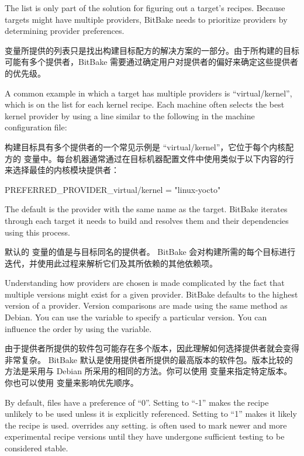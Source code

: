 
The  list is only part of the solution for figuring out a target's recipes. Because targets might have multiple providers, BitBake needs to prioritize providers by determining provider preferences.

 变量所提供的列表只是找出构建目标配方的解决方案的一部分。由于所构建的目标可能有多个提供者，BitBake 需要通过确定用户对提供者的偏好来确定这些提供者的优先级。

A common example in which a target has multiple providers is ``virtual/kernel'', which is on the  list for each kernel recipe. Each machine often selects the best kernel provider by using a line similar to the following in the machine configuration file:

构建目标具有多个提供者的一个常见示例是 ``virtual/kernel''，它位于每个内核配方的  变量中。每台机器通常通过在目标机器配置文件中使用类似于以下内容的行来选择最佳的内核模块提供者：

\begin{pyglist}
PREFERRED_PROVIDER_virtual/kernel = "linux-yocto"
\end{pyglist}

The default  is the provider with the same name as the target. BitBake iterates through each target it needs to build and resolves them and their dependencies using this process.

默认的  变量的值是与目标同名的提供者。 BitBake 会对构建所需的每个目标进行迭代，并使用此过程来解析它们及其所依赖的其他依赖项。

Understanding how providers are chosen is made complicated by the fact that multiple versions might exist for a given provider. BitBake defaults to the highest version of a provider. Version comparisons are made using the same method as Debian. You can use the  variable to specify a particular version. You can influence the order by using the  variable.

由于提供者所提供的软件包可能存在多个版本，因此理解如何选择提供者就会变得非常复杂。 BitBake 默认是使用提供者所提供的最高版本的软件包。版本比较的方法是采用与 Debian 所采用的相同的方法。你可以使用  变量来指定特定版本。你也可以使用  变量来影响优先顺序。

By default, files have a preference of ``0''. Setting  to ``-1'' makes the recipe unlikely to be used unless it is explicitly referenced. Setting  to ``1'' makes it likely the recipe is used.  overrides any  setting.  is often used to mark newer and more experimental recipe versions until they have undergone sufficient testing to be considered stable.

